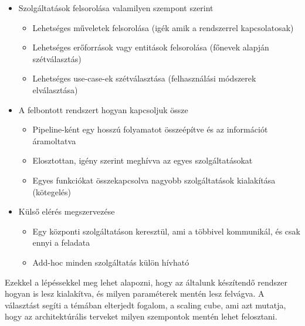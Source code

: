 \documentclass[11pt,magyar,a4paper,twoside,]{report}
\providecommand{\tightlist}{%
  \setlength{\itemsep}{0pt}\setlength{\parskip}{0pt}}
\begin{document}
\begin{itemize}
\tightlist
\item
  Szolgáltatások felsorolása valamilyen szempont szerint

  \begin{itemize}
  \tightlist
  \item
    Lehetséges műveletek felsorolása (igék amik a rendszerrel
    kapcsolatosak)
  \item
    Lehetséges erőforrások vagy entitások felsorolása (főnevek alapján
    szétválasztás)
  \item
    Lehetséges use-case-ek szétválasztása (felhasználási módszerek
    elválasztása)
  \end{itemize}
\item
  A felbontott rendszert hogyan kapcsoljuk össze

  \begin{itemize}
  \tightlist
  \item
    Pipeline-ként egy hosszú folyamatot összeépítve és az információt
    áramoltatva
  \item
    Elosztottan, igény szerint meghívva az egyes szolgáltatásokat
  \item
    Egyes funkciókat összekapcsolva nagyobb szolgáltatások kialakítása
    (kötegelés)
  \end{itemize}
\item
  Külső elérés megszervezése

  \begin{itemize}
  \tightlist
  \item
    Egy központi szolgáltatáson keresztül, ami a többivel kommunikál, és
    csak ennyi a feladata
  \item
    Add-hoc minden szolgáltatás külön hívható
  \end{itemize}
\end{itemize}

Ezekkel a lépéssekkel meg lehet alapozni, hogy az általunk készítendő
rendszer hogyan is lesz kialakítva, és milyen paraméterek mentén lesz
felvágva. A választást segíti a témában elterjedt fogalom, a scaling
cube\citep{scale-cube}, ami azt mutatja, hogy az architektúrális
terveket milyen szempontok mentén lehet felosztani.
\end{document}
